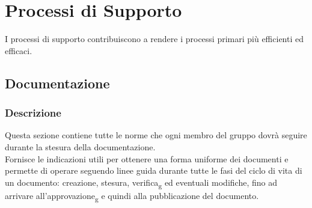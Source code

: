 \section{Processi di Supporto}
I processi di supporto contribuiscono a rendere i processi primari più efficienti ed efficaci.
    \subsection{Documentazione}
        \subsubsection{Descrizione}
        Questa sezione contiene tutte le norme che ogni membro del gruppo dovrà seguire durante 
        la stesura della documentazione.\\
        Fornisce le indicazioni utili per ottenere una forma uniforme dei documenti e permette di operare seguendo linee guida durante tutte le fasi del ciclo di vita di un documento: creazione, stesura, verifica\textsubscript{g} ed 
        eventuali modifiche, fino ad arrivare all'approvazione\textsubscript{g} e quindi alla pubblicazione del documento.
